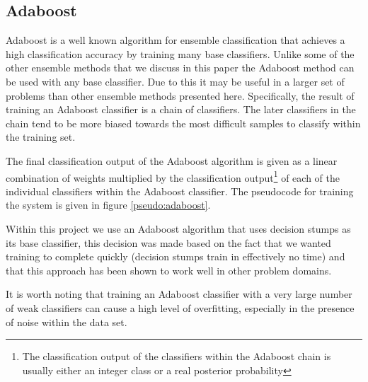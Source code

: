 \documentclass[ %
                    author={Sam Phippen},
                supervisor={Dr. Rafal Bogacz},
                     title={Real time voice activity detectors in noisy personal computing environments},
                  subtitle={},
                    degree={MEng},
                      year={2012} ]{thesis}
\begin{document}
\subsection{Adaboost}

Adaboost is a well known\cite{viola}\cite{sun2006reducing} 
algorithm for ensemble classification that achieves a
high classification accuracy by training many base classifiers. Unlike some of
the other ensemble methods that we discuss in this paper the Adaboost method
can be used with any base classifier. Due to this it may be useful in a larger
set of problems than other ensemble methods presented here. Specifically, the
result of training an Adaboost classifier is a chain of classifiers. The later
classifiers in the chain tend to be more biased towards the most difficult
samples to classify within the training set.

The final classification output of the Adaboost algorithm is given as a linear
combination of weights multiplied by the classification output\footnote{The
    classification output of the classifiers within the Adaboost chain is
usually either an integer class or a real posterior probability} of each of
the individual classifiers within the Adaboost classifier. The pseudocode
for training the system is given in figure \ref{pseudo:adaboost}.

Within this project we use an Adaboost algorithm that uses decision stumps as
its base classifier, this decision was made based on the fact that we wanted
training to complete quickly (decision stumps train in effectively no time) and
that this approach has been shown to work well in other problem
domains\cite{viola}.

It is worth noting that training an Adaboost classifier with a very large
number of weak classifiers can cause a high level of overfitting, especially
in the presence of noise within the data set\cite{sun2006reducing}.
\end{document}
